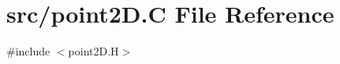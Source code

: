 \hypertarget{point2_d_8_c}{}\section{src/point2D.C File Reference}
\label{point2_d_8_c}
{\ttfamily \#include $<$point2\+D.\+H$>$}\newline
